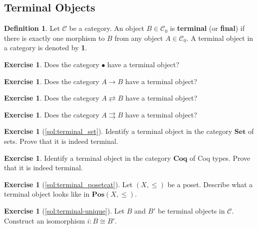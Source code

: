 \documentclass[a4paper,10pt]{scrartcl}
\theoremstyle{plain}
\theoremstyle{definition}
\newtheorem{dfn}[thm]{Definition}
\newtheorem{exer}[thm]{Exercise}
\newcommand{\Cat}[1]{\mathcal{#1}}
\newcommand{\CC}{\Cat{C}}
\newcommand{\Catb}[1]{\mathbf{#1}}
\newcommand{\SET}{\Catb{Set}}
\newcommand{\POS}{\Catb{Pos}}
\newcommand{\COQ}{\Catb{Coq}}
\newcommand{\Ob}[1]{{#1}_0}
\begin{document}
\subsection{Terminal Objects}
\label{sec:terminal-objects}



\begin{dfn}
  Let $\CC$ be a category. An object $B \in \Ob{\CC}$ is \textbf{terminal} (or \textbf{final}) if there is exactly one morphism to $B$ from any object $A \in \Ob{\CC}$.
  A terminal object in a category is denoted by \textbf{1}.
\end{dfn}

\begin{exer}
  Does the category $\bullet$ have a terminal object?
\end{exer}

\begin{exer}
  Does the category $A \to B$ have a terminal object?
\end{exer}

\begin{exer}
  Does the category $A \rightleftarrows B$ have a terminal object?
\end{exer}

\begin{exer}
  Does the category $A \rightrightarrows B$ have a terminal object?
\end{exer}



\begin{exer}[\cref{sol:terminal_set}]\label{exer:terminal_set}
  Identify a terminal object in the category $\SET$ of sets.
  Prove that it is indeed terminal.
\end{exer}

\begin{exer}
  Identify a terminal object in the category $\COQ$ of Coq types.
  Prove that it is indeed terminal.
\end{exer}

\begin{exer}[\cref{sol:terminal_posetcat}]\label{exer:terminal_posetcat}
  Let $(X,\leq)$ be a poset. Describe what a terminal object looks like in  $\POS(X,\leq)$.
\end{exer}

\begin{exer}[\cref{sol:terminal-unique}]\label{exer:terminal-unique}
  Let $B$ and $B'$ be terminal objects in $\CC$. Construct an isomorphism $i : B \cong B'$.
\end{exer}
\end{document}
